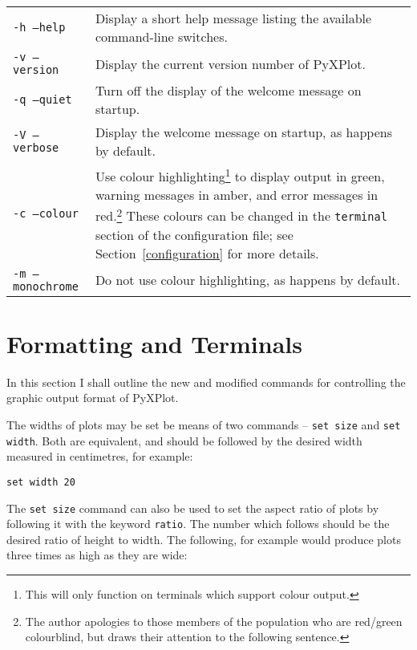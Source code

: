 \documentclass[a4paper,onecolumn,11pt]{book}
\begin{document}
\begin{longtable}{p{3.5cm}p{8.5cm}}
\texttt{-h --help} & Display a short help message listing the available command-line switches.\\
\texttt{-v --version} & Display the current version number of PyXPlot.\\
\texttt{-q --quiet} & Turn off the display of the welcome message on startup. \\
\texttt{-V --verbose} & Display the welcome message on startup, as happens by default. \\
\texttt{-c --colour} & Use colour highlighting\footnote{This will only function on terminals which support colour output.} to display output in green, warning messages in amber, and error messages in red.\footnote{The author apologies to those members of the population who are red/green colourblind, but draws their attention to the following sentence.} These colours can be changed in the \texttt{terminal} section of the configuration file; see Section~\ref{configuration} for more details. \\
\texttt{-m --monochrome} & Do not use colour highlighting, as happens by default. \\
\end{longtable}

\section{Formatting and Terminals}
\label{set_terminal2}

In this section I shall outline the new and modified commands for controlling
the graphic output format of PyXPlot.

The widths of plots may be set be means of two commands -- \texttt{set
size} and \texttt{set
width}. Both are
equivalent, and should be followed by the desired width measured in
centimetres, for example:

\begin{verbatim}
set width 20
\end{verbatim}

The \texttt{set size} command can also be used to set the aspect ratio of plots
by following it with the keyword \texttt{ratio}. The number which follows should be
the desired ratio of height to width. The following, for example would produce
plots three times as high as they are wide:
\end{document}
